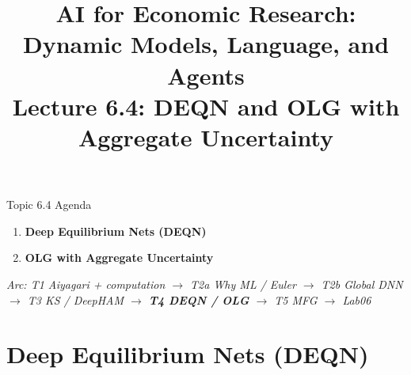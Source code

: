


\graphicspath{{./pic/}{../../MiniCourse_8hr/Slides/Module2_DL_RL_Macro/pic/}{../}}

\title[AI for Econ Research]{AI for Economic Research: Dynamic Models, Language, and Agents\\
Lecture 6.4: DEQN and OLG with Aggregate Uncertainty}



\makebeamertitle

\begin{frame}{Topic 6.4 Agenda}
\begin{enumerate}
  \item \textbf{Deep Equilibrium Nets (DEQN)}
  \medskip
  \item \textbf{OLG with Aggregate Uncertainty}
\end{enumerate}
\medskip
\textit{Arc: T1 Aiyagari + computation $\to$ T2a Why ML / Euler $\to$ T2b Global DNN $\to$ T3 KS / DeepHAM $\to$ \textbf{T4 DEQN / OLG} $\to$ T5 MFG $\to$ Lab06}
\end{frame}

\section{Deep Equilibrium Nets (DEQN)}

